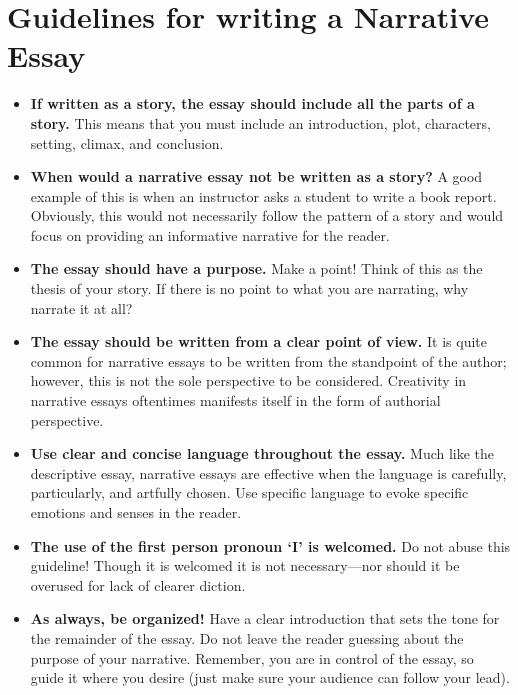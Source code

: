 \section{Guidelines for writing a Narrative Essay}
	\begin{itemize}
		\item \textbf{If written as a story, the essay should include all the parts of a story.} This means that you must include an introduction, plot, characters, setting, climax, and conclusion.
		\item \textbf{When would a narrative essay not be written as a story?} A good example of this is when an instructor asks a student to write a book report. Obviously, this would not necessarily follow the pattern of a story and would focus on providing an informative narrative for the reader.
		\item \textbf{The essay should have a purpose.} Make a point! Think of this as the thesis of your story. If there is no point to what you are narrating, why narrate it at all?
		\item \textbf{The essay should be written from a clear point of view.} It is quite common for narrative essays to be written from the standpoint of the author; however, this is not the sole perspective to be considered. Creativity in narrative essays oftentimes manifests itself in the form of authorial perspective.
		\item \textbf{Use clear and concise language throughout the essay.} Much like the descriptive essay, narrative essays are effective when the language is carefully, particularly, and artfully chosen. Use specific language to evoke specific emotions and senses in the reader.
		\item \textbf{The use of the first person pronoun ‘I’ is welcomed.} Do not abuse this guideline! Though it is welcomed it is not necessary—nor should it be overused for lack of clearer diction.
		\item \textbf{As always, be organized!} Have a clear introduction that sets the tone for the remainder of the essay. Do not leave the reader guessing about the purpose of your narrative. Remember, you are in control of the essay, so guide it where you desire (just make sure your audience can follow your lead).
	\end{itemize}

